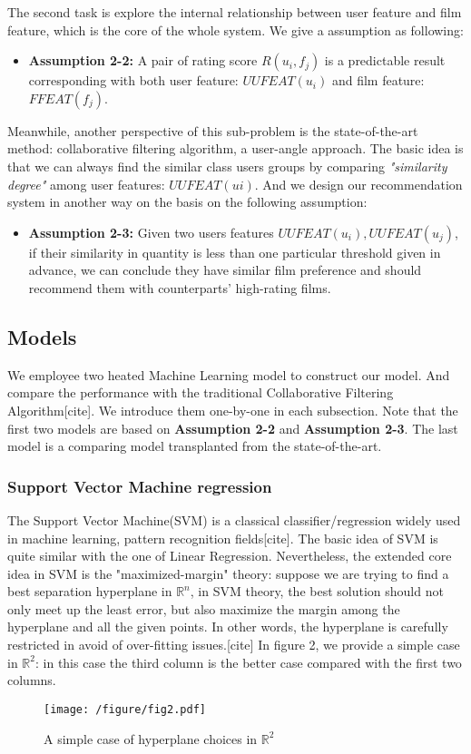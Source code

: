 The second task is explore the internal relationship between user feature and film feature, which is the core of the whole system. We give a assumption as following:
\begin{itemize}
\item \textbf{Assumption 2-2:} A pair of rating score $R(u_{i},f_{j})$ is a predictable result corresponding with both user feature: $UUFEAT(u_{i})$ and film feature: $FFEAT(f_{j})$. 
\end{itemize} 

Meanwhile, another perspective of this sub-problem is the state-of-the-art method: collaborative filtering algorithm, a user-angle approach\cite{linden2003amazon,breese1998empirical}. The basic idea is that we can always find the similar class users groups by comparing \textit{"similarity degree"} among user features: $UUFEAT(u{i})$. And we design our recommendation system in another way on the basis on the following assumption:
\begin{itemize}
\item \textbf{Assumption 2-3:} Given two users features $UUFEAT(u_{i}), UUFEAT(u_{j})$, if their similarity in quantity is less than one particular threshold given in advance, we can conclude they have similar film preference and should recommend them with counterparts' high-rating films.
\end{itemize}

\subsection{Models}
We employee two heated Machine Learning model to construct our model. And compare the performance with the traditional Collaborative Filtering Algorithm[cite]. We introduce them one-by-one in each subsection. Note that the first two models are based on \textbf{Assumption 2-2} and \textbf{Assumption 2-3}. The last model is a comparing model transplanted from the state-of-the-art.

\subsubsection{Support Vector Machine regression}
The Support Vector Machine(SVM)\cite{suykens1999least} is a classical classifier/regression widely used in machine learning, pattern recognition fields[cite]. The basic idea of SVM is quite similar with the one of Linear Regression. Nevertheless, the extended core idea in SVM is the "maximized-margin" theory: suppose we are trying to find a best separation hyperplane in $\mathbb{R}^{n}$, in SVM theory, the best solution should not only meet up the least error, but also maximize the margin among the hyperplane and all the given points. In other words, the hyperplane is carefully restricted in avoid of over-fitting issues.[cite]
In figure 2, we provide a simple case in $\mathbb{R}^{2}$: in this case the third column is the better case compared with the first two columns. 
\begin{figure}[htbp]
\centering
\texttt{[image: /figure/fig2.pdf]}
\caption{A simple case of hyperplane choices in $\mathbb{R}^{2}$} \label{fig:2}
\end{figure}

